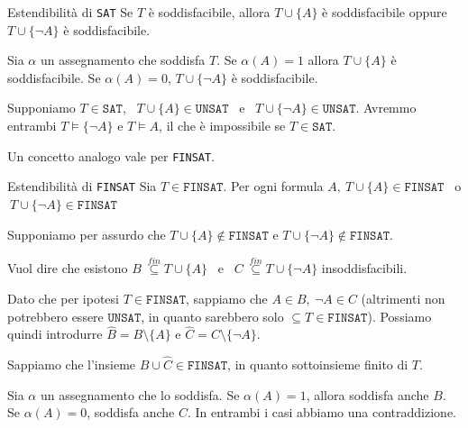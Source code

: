 \documentclass[a4paper,11pt]{report}
\newcommand{\FINSAT}{\texttt{FINSAT}}
\newcommand{\UNSAT}{\texttt{UNSAT}}
\begin{document}
\begin{thmframe}{Estendibilità di \texttt{SAT}}{}
    Se \( T \) è soddisfacibile, allora \( T \cup \{A\} \) è soddisfacibile oppure \( T \cup \{\neg A\} \) è soddisfacibile.

    \begin{proofframe}[title=dimostrazione dalle dispense]{}
        Sia \( \alpha \) un assegnamento che soddisfa \( T \). Se \( \alpha(A)=1 \) allora \( T \cup \{A\} \) è soddisfacibile. Se \( \alpha(A) = 0 \),  \( T \cup \{\neg A\} \) è soddisfacibile.
    \end{proofframe}
    \begin{proofframe}[title=dimostrazione vista in classe]{}
        Supponiamo \( T \in \texttt{SAT} \), \ \( T \cup \{A\} \in \texttt{UNSAT}\) \ e \ \( T \cup \{\neg A\} \in \texttt{UNSAT}\). Avremmo entrambi \( T \vDash \{\neg A\}\) e \( T \vDash A \), il che è impossibile se \( T\in \texttt{SAT} \).
    \end{proofframe}
\end{thmframe}

Un concetto analogo vale per \texttt{FINSAT}.

\begin{thmframe}{Estendibilità di \texttt{FINSAT}}{}
    Sia \( T \in \texttt{FINSAT} \). Per ogni formula \( A, \  T \cup \{A\} \in \texttt{FINSAT}\)  \ o \( \ T \cup \{\neg A\} \in \texttt{FINSAT}\)
    \begin{pframe}{}
        Supponiamo per assurdo che \( T \cup \{A\} \not\in \texttt{FINSAT}\) e \( T \cup \{\neg A\} \not\in \texttt{FINSAT}\).

        Vuol dire che esistono \( B \ \overset{fin}{\subseteq} T \cup \{A\}\) \ e \ \( C \ \overset{fin}{\subseteq} T \cup \{\neg A\}\) insoddisfacibili.

        Dato che per ipotesi \( T \in \texttt{FINSAT} \), sappiamo che \( A \in B, \ \neg A \in C \) {\small\color{gray}(altrimenti non potrebbero essere \( \UNSAT \), in quanto sarebbero solo \( \subseteq T \in \FINSAT \))}. Possiamo quindi introdurre \( \hat B = B \setminus \{A\}\) e \( \hat C = C \setminus \{\neg A\}\).

        Sappiamo che l'insieme \( \hat B \cup \hat C  \in \texttt{FINSAT}\), in quanto sottoinsieme finito di \( T \).

        Sia \( \alpha \) un assegnamento che lo soddisfa. Se \( \alpha(A)=1 \), allora soddisfa anche \( B \). Se \( \alpha(A) = 0 \), soddisfa anche \( C \). In entrambi i casi abbiamo una contraddizione.

    \end{pframe}

\end{thmframe}
\end{document}

